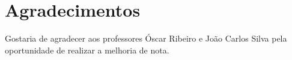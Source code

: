 \chapter*{Agradecimentos}

Gostaria de agradecer aos professores Óscar Ribeiro e João Carlos Silva pela oportunidade de realizar a melhoria de nota.

\vspace{10mm}
